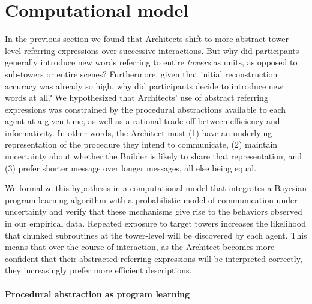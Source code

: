 \documentclass[10pt,letterpaper]{article}
\begin{document}
\section{Computational model}

In the previous section we found that Architects shift to more abstract tower-level referring expressions over successive interactions.
But why did participants generally introduce new words referring to entire \emph{towers} as units, as opposed to sub-towers or entire scenes?
Furthermore, given that initial reconstruction accuracy was already so high, why did participants decide to introduce new words at all?
We hypothesized that Architects' use of abstract referring expressions was constrained by the procedural abstractions available to each agent at a given time, as well as a rational trade-off between efficiency and informativity.
In other words, the Architect must (1) have an underlying representation of the procedure they intend to communicate, (2) maintain uncertainty about whether the Builder is likely to share that representation, and (3) prefer shorter message over longer messages, all else being equal.

We formalize this hypothesis in a computational model that integrates a Bayesian program learning algorithm  \cite{ellis2020dreamcoder} with a probabilistic model of communication under uncertainty and verify that these mechanisms give rise to the behaviors observed in our empirical data.
Repeated exposure to target towers increases the likelihood that chunked subroutines at the tower-level will be discovered by each agent.
This means that over the course of interaction, as the Architect becomes more confident that their abstracted referring expressions will be interpreted correctly, they increasingly prefer more efficient descriptions.


\paragraph{Procedural abstraction as program learning}

\newcommand{\mdl}{\mathsf{MDL}}
\newcommand{\size}{\mathsf{size}}
\end{document}
